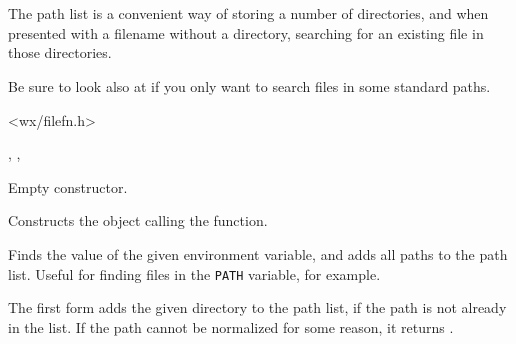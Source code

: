 \section{}\label{wxpathlist}

The path list is a convenient way of storing a number of directories, and
when presented with a filename without a directory, searching for an existing file
in those directories.

Be sure to look also at  if you only
want to search files in some standard paths.




<wx/filefn.h>




, , 



\label{wxpathlistctor}


Empty constructor.


Constructs the object calling the  function.


\label{wxpathlistaddenvlist}


Finds the value of the given environment variable, and adds all paths
to the path list. Useful for finding files in the {\tt PATH} variable, for
example.


\label{wxpathlistadd}



The first form adds the given directory to the path list, if the path is not already in the list.
If the path cannot be normalized for some reason, it returns \false.

